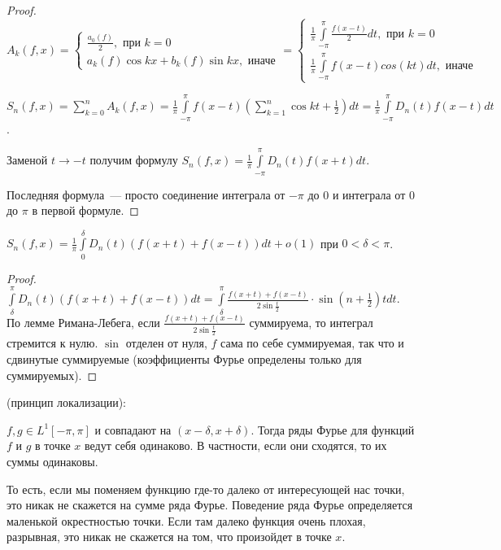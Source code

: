 \begin{proof}
    $A_k(f, x) = \begin{cases}
            \frac{a_0(f)}{2}, \text{ при } k = 0 \\
            a_k(f) \cos kx + b_k(f) \sin kx, \text{ иначе}
        \end{cases} =
        \begin{cases}
            \frac{1}{\pi} \int \limits_{-\pi}^{\pi} \frac{f(x - t)}{2} dt, \text{ при } k = 0 \\
            \frac{1}{\pi} \int \limits_{-\pi}^{\pi} f(x - t) cos(kt) dt , \text{ иначе}
        \end{cases}$

    $S_n(f, x) = \sum \limits_{k = 0}^{n} A_k(f, x) = \frac{1}{\pi} \int \limits_{-\pi}^{\pi} f(x - t) \left(
        \sum \limits_{k = 1}^{n} \cos kt + \frac{1}{2} \right) dt = \frac{1}{\pi} \int \limits_{-\pi}^{\pi} D_n(t) f(x - t) dt$.

    Заменой $t \to -t$ получим формулу $S_n(f, x) = \frac{1}{\pi} \int \limits_{-\pi}^{\pi} D_n(t) f(x + t) dt$.

    Последняя формула~--- просто соединение интеграла от $-\pi$ до $0$ и интеграла от $0$ до $\pi$ в первой формуле.
\end{proof}

\begin{consequence}
    $S_n(f, x) = \frac{1}{\pi} \int \limits_{0}^{\delta} D_n(t) (f(x + t) + f(x - t)) dt + o(1)$ при $0 < \delta < \pi$.
\end{consequence}

\begin{proof}
    $\int \limits_{\delta}^{\pi} D_n(t) (f(x + t) + f(x - t)) dt =
        \int \limits_{\delta}^{\pi} \frac{f(x + t) + f(x - t)}{2 \sin \frac{t}{2}} \cdot \sin (n + \frac{1}{2}) t dt$.
    По лемме Римана-Лебега, если $\frac{f(x + t) + f(x - t)}{2 \sin \frac{t}{2}}$ суммируема, то интеграл стремится к нулю.
    $\sin$ отделен от нуля, $f$ сама по себе суммируемая, так что и сдвинутые суммируемые (коэффициенты Фурье определены только для суммируемых).
\end{proof}

\begin{theorem} (принцип локализации):

    $f, g \in L^1 [-\pi, \pi]$ и совпадают на $(x - \delta, x + \delta)$. Тогда ряды Фурье для функций $f$ и $g$ в точке $x$
    ведут себя одинаково. В частности, если они сходятся, то их суммы одинаковы.

    То есть, если мы поменяем функцию где-то далеко от интересующей нас точки, это никак не скажется на сумме ряда Фурье. Поведение ряда Фурье определяется маленькой окрестностью точки. Если там далеко функция очень плохая, разрывная, это никак не скажется на том, что произойдет в точке $x$.
\end{theorem}

